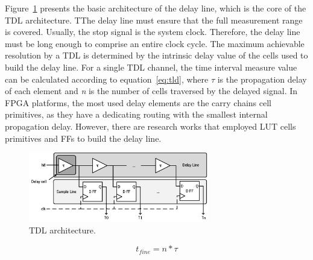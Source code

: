 Figure~\ref{fig:tdl_architecture} presents the basic architecture of the delay line, which is the core of the \gls{TDL} architecture. TThe delay line must ensure that the full measurement range is covered. Usually, the stop signal is the system clock. Therefore, the delay line must be long enough to comprise an entire clock cycle. The maximum achievable resolution by a \gls{TDL} is determined by the intrinsic delay value of the cells used to build the delay line. For a single \gls{TDL} channel, the time interval measure value can be calculated according to equation~\ref{eq:tld}, where $\tau$ is the propagation delay of each element and \textit{n} is the number of cells traversed by the delayed signal. In \gls{FPGA} platforms, the most used delay elements are the carry chains cell primitives, as they have a dedicating routing with the smallest internal propagation delay. However, there are research works that employed \gls{LUT} cells primitives \citep{tdl_lut} and \glspl{FF} \citep{tld_ff} to build the delay line.

\begin{figure}[ht!]
	\centering
	\includegraphics[width=0.7\textwidth]{img/02_StateofArt/tdl_architecture.png}
	\caption{TDL architecture.}
	\label{fig:tdl_architecture}
\end{figure}

\begin{equation}
	t_{fine} = n * \tau
	\label{eq:tld}
\end{equation}


